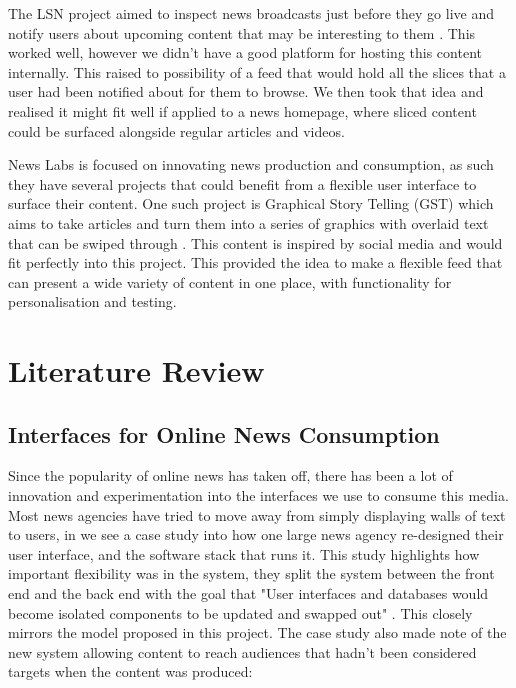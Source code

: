 \documentclass[12pt,titlepage]{article}
\begin{document}
  The LSN project aimed to inspect news broadcasts just before they go live and
  notify users about upcoming content that may be interesting to them
  \cite{lsn}. This worked well, however we didn't have a good platform for
  hosting this content internally. This raised to possibility of a feed that
  would hold all the slices that a user had been notified about for them to
  browse. We then took that idea and realised it might fit well if applied to a
  news homepage, where sliced content could be surfaced alongside regular
  articles and videos.

  News Labs is focused on innovating news production and consumption, as such
  they have several projects that could benefit from a flexible user interface
  to surface their content. One such project is Graphical Story Telling (GST)
  which aims to take articles and turn them into a series of graphics with
  overlaid text that can be swiped through \cite{gst}. This content is inspired
  by social media and would fit perfectly into this project. This provided the
  idea to make a flexible feed that can present a wide variety of content in one
  place, with functionality for personalisation and testing.

\section{Literature Review}

  \subsection{Interfaces for Online News Consumption}

  Since the popularity of online news has taken off, there has been a lot of
  innovation and experimentation into the interfaces we use to consume this
  media. Most news agencies have tried to move away from simply displaying walls
  of text to users, in \cite{msnbc} we see a case study into how one large news
  agency re-designed their user interface, and the software stack that runs it.
  This study highlights how important flexibility was in the system, they split
  the system between the front end and the back end with the goal that "User
  interfaces and databases would become isolated components to be updated and
  swapped out" \cite{msnbc}. This closely mirrors the model proposed in this
  project. The case study also made note of the new system allowing content to
  reach audiences that hadn't been considered targets when the content was
  produced:
\end{document}
